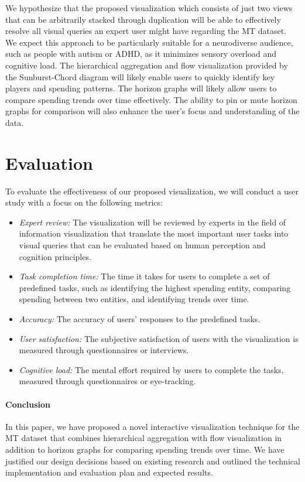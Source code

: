 \documentclass{vgtc}
\begin{document}
We hypothesize that the proposed visualization which consists of just two views that can be arbitrarily stacked through duplication will be able to effectively resolve all visual queries an expert user might have regarding the MT dataset. We expect this approach to be particularly suitable for a neurodiverse audience, such as people with autism or ADHD, as it minimizes sensory overload and cognitive load. The hierarchical aggregation and flow visualization provided by the Sunburst-Chord diagram will likely enable users to quickly identify key players and spending patterns. The horizon graphs will likely allow users to compare spending trends over time effectively. The ability to pin or mute horizon graphs for comparison will also enhance the user's focus and understanding of the data.

\section{Evaluation} %

To evaluate the effectiveness of our proposed visualization, we will conduct a user study with a focus on the following metrics:

\begin{itemize}
    \item \textit{Expert review:} The visualization will be reviewed by experts in the field of information visualization that translate the most important user tasks into visual queries that can be evaluated based on human perception and cognition principles.
    \item \textit{Task completion time:} The time it takes for users to complete a set of predefined tasks, such as identifying the highest spending entity, comparing spending between two entities, and identifying trends over time.
    \item \textit{Accuracy:} The accuracy of users' responses to the predefined tasks.
    \item \textit{User satisfaction:} The subjective satisfaction of users with the visualization is measured through questionnaires or interviews.
    \item \textit{Cognitive load:} The mental effort required by users to complete the tasks, measured through questionnaires or eye-tracking.
\end{itemize}

\paragraph{Conclusion} In this paper, we have proposed a novel interactive visualization technique for the MT dataset that combines hierarchical aggregation with flow visualization in addition to horizon graphs for comparing spending trends over time. We have justified our design decisions based on existing research and outlined the technical implementation and evaluation plan and expected results.

% 

% 
% 
% 


\end{document}
